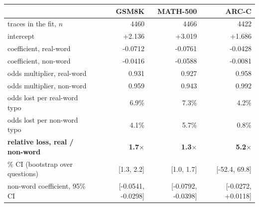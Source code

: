 \begin{tabular}{lrrr}
\toprule
& \textbf{GSM8K} & \textbf{MATH-500} & \textbf{ARC-C} \\
\midrule
traces in the fit, $n$ & 4460 & 4466 & 4422 \\
intercept & +2.136 & +3.019 & +1.686 \\
coefficient, real-word & -0.0712 & -0.0761 & -0.0428 \\
coefficient, non-word & -0.0416 & -0.0588 & -0.0081 \\
odds multiplier, real-word & 0.931 & 0.927 & 0.958 \\
odds multiplier, non-word & 0.959 & 0.943 & 0.992 \\
odds lost per real-word typo & 6.9\% & 7.3\% & 4.2\% \\
odds lost per non-word typo & 4.1\% & 5.7\% & 0.8\% \\
\midrule
\textbf{relative loss, real / non-word} & \textbf{1.7$\times$} & \textbf{1.3$\times$} & \textbf{5.2$\times$} \\
\quad 95\% CI (bootstrap over questions) & [1.3, 2.2] & [1.0, 1.7] & [-52.4, 69.8] \\
non-word coefficient, 95\% CI & [-0.0541, -0.0298] & [-0.0792, -0.0398] & [-0.0272, +0.0118] \\
\bottomrule
\end{tabular}
